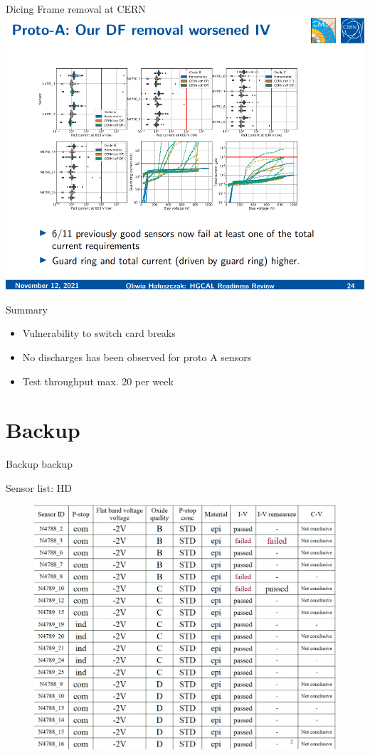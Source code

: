 \documentclass{beamer}
\begin{document}
\begin{frame}{Dicing Frame removal at CERN}
  \includegraphics[width=.7\textwidth]{plots/Dicing_Frame_Removal.png}
\end{frame}

\begin{frame}{Summary}
  \begin{itemize}
    \item Vulnerability to switch card breaks
    \item No discharges has been observed for proto A sensors
    \item Test throughput max. 20 per week
  \end{itemize}
\end{frame}

\section*{Backup}

\begin{frame}{Backup}
	\center
	\huge
	backup
\end{frame}

\begin{frame}{Sensor list: HD}
   \begin{figure}
       \includegraphics[width=.8\textwidth]{plots/PM8_sensorList.png}
   \end{figure} 
\end{frame}
\end{document}
